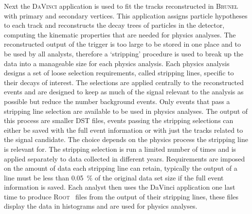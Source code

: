 Next the \textsc{DaVinci} application is used to fit the tracks reconstructed in \textsc{Brunel} with primary and secondary vertices. This application assigns particle hypotheses to each track and reconstructs the decay trees of particles in the detector, computing the kinematic properties that are needed for physics analyses. The reconstructed output of the trigger is too large to be stored in one place and to be used by all analysts, therefore a `stripping' procedure is used to break up the data into a manageable size for  each physics analysis. Each physics analysis designs a set of loose selection requirements, called stripping lines, specific to their decays of interest. The selections are applied centrally to the reconstructed events and are designed to keep as much of the signal relevant to the analysis as possible but reduce the number background events. Only events that pass a stripping line selection are available to be used in physics analyses. The output of this process are smaller DST files, events passing the stripping selections can either be saved with the full event information or with just the tracks related to the signal candidate. The choice depends on the physics process the stripping line is relevant for. The stripping selection is run a limited number of times and is applied separately to data collected in different years. Requirements are imposed on the amount of data each stripping line can retain, typically the output of a line must be less than 0.05~$\%$ of the original data set size if the full event information is saved. Each analyst then uses the DaVinci application one last time to produce \textsc{Root}~\cite{Brun:1997pa} files from the output of their stripping lines, these files display the data in histograms and are used for physics analyses. %


